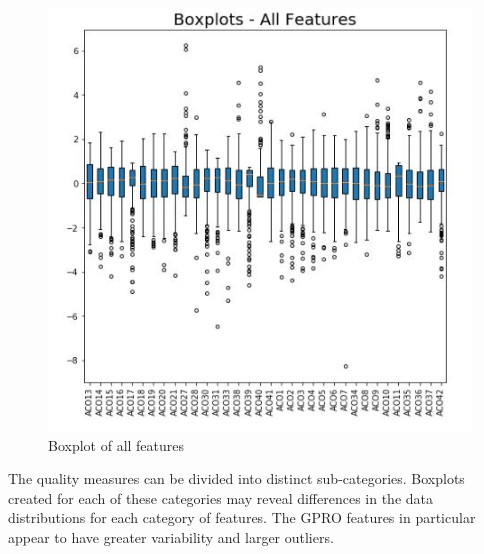 \documentclass{article}
\begin{document}
\begin{figure}[H]
    \centering
    \includegraphics{BoxPlots_ALL.jpg}
    \caption{Boxplot of all features}
    \label{fig:boxall}
\end{figure}

The quality measures can be divided into distinct sub-categories. Boxplots created for each of these categories may reveal differences in the data distributions for each category of features. The GPRO features in particular appear to have greater variability and larger outliers.
\end{document}
